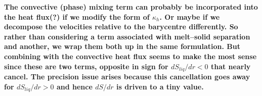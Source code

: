 \textbf{The convective (phase) mixing term can probably be incorporated into the heat flux(?) if we modify the form of $\kappa_h$.  Or maybe if we decompose the velocities relative to the barycentre differently.  So rather than considering a term associated with melt--solid separation and another, we wrap them both up in the same formulation.  But combining with the convective heat flux seems to make the most sense since these are two terms, opposite in sign for $dS_{liq}/dr<0$ that nearly cancel.  The precision issue arises because this cancellation goes away for $dS_{liq}/dr>0$ and hence $dS/dr$ is driven to a tiny value.}
